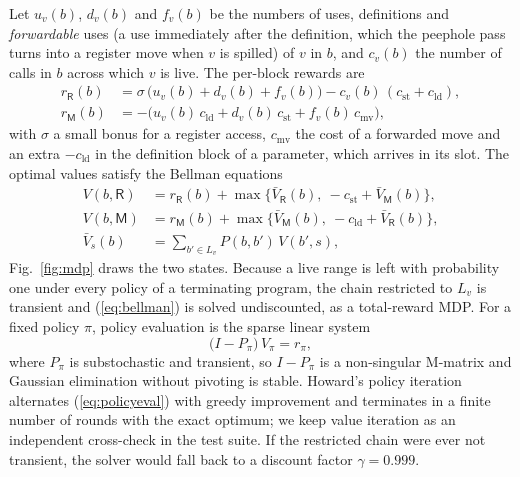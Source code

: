 \documentclass[conference]{IEEEtran}
\newcommand{\Reg}{\mathsf{R}}
\newcommand{\Mem}{\mathsf{M}}
\newcommand{\cld}{c_{\mathrm{ld}}}
\newcommand{\cst}{c_{\mathrm{st}}}
\newcommand{\csv}{\sigma}
\newcommand{\cmv}{c_{\mathrm{mv}}}
\begin{document}
Let $u_v(b)$, $d_v(b)$ and $f_v(b)$ be the numbers of uses,
definitions and \emph{forwardable} uses (a use immediately after the
definition, which the peephole pass turns into a register move when $v$
is spilled) of $v$ in $b$, and $c_v(b)$ the number of calls in $b$
across which $v$ is live. The per-block rewards are
\begin{equation}
\begin{aligned}
r_\Reg(b) &= \csv\,\big(u_v(b)+d_v(b)+f_v(b)\big)-c_v(b)\,(\cst+\cld),\\
r_\Mem(b) &= -\big(u_v(b)\,\cld + d_v(b)\,\cst + f_v(b)\,\cmv\big),
\end{aligned}
\label{eq:reward}
\end{equation}
with $\csv$ a small bonus for a register access, $\cmv$ the cost of a
forwarded move and an extra $-\cld$ in the definition block of a
parameter, which arrives in its slot. The optimal values satisfy the
Bellman equations~\cite{bellman1957,puterman1994}
\begin{equation}
\begin{aligned}
V(b,\Reg) &= r_\Reg(b) + \max\big\{\bar V_\Reg(b),\ -\cst + \bar V_\Mem(b)\big\},\\
V(b,\Mem) &= r_\Mem(b) + \max\big\{\bar V_\Mem(b),\ -\cld + \bar V_\Reg(b)\big\},\\
\bar V_s(b) &= \textstyle\sum_{b'\in L_v} P(b,b')\,V(b',s),
\end{aligned}
\label{eq:bellman}
\end{equation}
Fig.~\ref{fig:mdp} draws the two states. Because a live range is left
with probability one under every policy of a terminating program, the
chain restricted to $L_v$ is transient and (\ref{eq:bellman}) is solved
undiscounted, as a total-reward MDP. For a fixed policy $\pi$, policy
evaluation is the sparse linear system
\begin{equation}
\big(I-P_\pi\big)\,V_\pi = r_\pi ,
\label{eq:policyeval}
\end{equation}
where $P_\pi$ is substochastic and transient, so $I-P_\pi$ is a
non-singular M-matrix and Gaussian elimination without pivoting is
stable. Howard's policy iteration~\cite{howard1960} alternates
(\ref{eq:policyeval}) with greedy improvement and terminates in a finite
number of rounds with the exact optimum; we keep value iteration as an
independent cross-check in the test suite. If the restricted chain
were ever not transient, the solver would fall back to a discount factor
$\gamma=0.999$.
\end{document}
